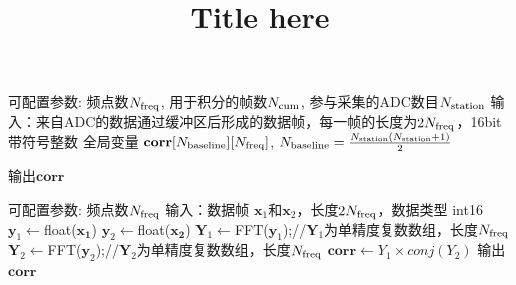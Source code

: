 \documentclass[11pt,includemp,a4paper]{article}
\title{Title here}
\author{}
\begin{document}
\begin{algorithm}[H]
    \SetAlgoLined
     可配置参数: 频点数$N_{\rm freq}$, 用于积分的帧数$N_{\rm cum}$, 参与采集的ADC数目$N_{\rm station}$\;
     输入：来自ADC的数据通过缓冲区后形成的数据帧，每一帧的长度为$2N_{\rm freq}$，16bit带符号整数\;
     全局变量 $\mathbf{corr}[N_{\rm baseline}][N_{\rm freq}]$, $N_{\rm baseline}=\frac{N_{\rm station}(N_{\rm station}+1)}{2}$\;
     
     输出$\mathbf{corr}$\;
     \caption{连续不断采集并在线计算自相关和互相关}
\end{algorithm}


\begin{algorithm}[H]
    \SetAlgoLined
     可配置参数: 频点数$N_{\rm freq}$\;
     输入：数据帧 $\mathbf{x}_1$和$\mathbf{x}_2$，长度$2N_{\rm freq}$，数据类型 int16\;
       $\mathbf{y}_1\leftarrow$float($\mathbf{x_1}$)\;
       $\mathbf{y}_2\leftarrow$float($\mathbf{x_2}$)\;
       $\mathbf{Y}_1\leftarrow$FFT($\mathbf{y}_1$);//$\mathbf{Y}_1$为单精度复数数组，长度$N_{\rm freq}$\;
       $\mathbf{Y}_2\leftarrow$FFT($\mathbf{y}_2$);//$\mathbf{Y}_2$为单精度复数数组，长度$N_{\rm freq}$\;
       $\mathbf{corr}\leftarrow Y_1\times conj(Y_2)$\;
     输出$\mathbf{corr}$\;
     \caption{\label{algo:single_corr} function calcCorr($\mathbf{x}_1$,$\mathbf{x}_2$)}
\end{algorithm}
\end{document}
